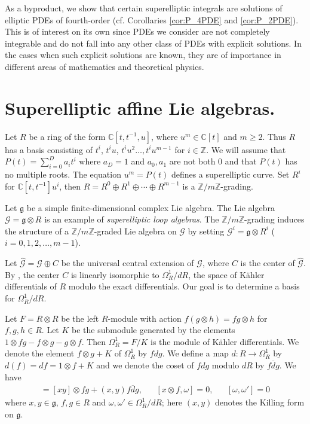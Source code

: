 \documentclass[review,nopreprintline]{elsarticle}
\theoremstyle{definition}
\numberwithin{equation}{section}
\theoremstyle{remark}
\newcommand{\fg}{\mathfrak{g}}
\newcommand{\ot}{\otimes}
\newcommand{\Z}{\mathbb{Z}}
\newcommand{\Cx}{\mathbb{C}}
\newcommand{\Gl}{{\mathcal{G}}}
\begin{document}
	   As a byproduct, we show that certain superelliptic integrals are solutions of elliptic PDEs of fourth-order (cf. Corollaries \ref{cor:P_4PDE} and \ref{cor:P_2PDE}). 
	   This is of interest on its own since PDEs we consider are not completely integrable and do not fall into any other class of PDEs with explicit solutions. In the cases when such explicit solutions are known, they are of importance in different areas of mathematics and theoretical physics.
	
	\section{Superelliptic affine Lie algebras.}

	    Let $R$ be a ring of the form $\Cx[t,t^{-1}, u]$, where $u^m\in \Cx[t]$ and $m\geq 2$. Thus $R$ has a basis consisting of $t^i$, $t^iu$, $t^iu^2\dots,t^iu^{m-1}$ for $i\in \Z$. We will assume that $P(t)=\sum^{D}_{i=0}a_it^i$ where $a_D=1$ and $a_0,a_1$ are not both 0 and that $P(t)$ has no multiple roots. The equation $u^m=P(t)$ defines a superelliptic curve. Set $R^i$ for $\Cx[t,t^{-1}]u^i$, then $R=R^0\oplus R^1\oplus \cdots \oplus R^{m-1}$ is a $\Z/m\mathbb{Z}$-grading. 
	
	    Let $\fg$ be a simple finite-dimensional complex Lie algebra. The Lie algebra $\Gl=\fg \ot R$ is an example of \emph{superelliptic loop algebras}. The $\Z/m\mathbb{Z}$-grading induces the structure of a $\Z/m\mathbb{Z}$-graded Lie algebra on $\Gl$ by setting $\Gl^i=\fg\ot R^i$ ($i=0,1,2,\dots, m-1$).
	
	    Let $\hat\Gl=\Gl\oplus C$ be the universal central extension of $\Gl$, where $C$  is the center of $\hat\Gl$. By \cite{kassel1984kahler}, the center $C$ is linearly isomorphic to $\Omega_R^1/dR$, the space of K\"ahler differentials of $R$ modulo the exact differentials. Our goal is to determine a basis for $\Omega_R^1/dR$. 
	
	    Let $F=R\otimes R$ be the left $R$-module with action $f(g\otimes h)=fg\otimes h$ for $f, g, h\in R$. Let $K$ be the submodule generated by the elements $1\otimes fg-f\otimes g-g\otimes f$. Then $\Omega_R^1=F/K$ is the module of K\"ahler differentials. We denote the element $f\otimes g+K$ of $\Omega_R^1$ by $fdg$. We define a map $d:R\rightarrow \Omega_R^1$ by $d(f)=df=1\otimes f+K$ and we denote the coset of $fdg$ modulo $dR$ by $\overline{fdg}$. We have
	        \begin{align}
	        	[x\ot f, y\ot g]=[xy]\otimes fg+(x,y)\overline{fdg},&& [x\ot f,\omega]=0,&& [\omega, \omega']=0
	   		\end{align}
	    where $x,y\in\fg$, $f,g\in R$ and $\omega, \omega' \in\Omega_R^1/dR$; here $(x,y)$ denotes the Killing form on $\fg$. 
	    
\end{document}

